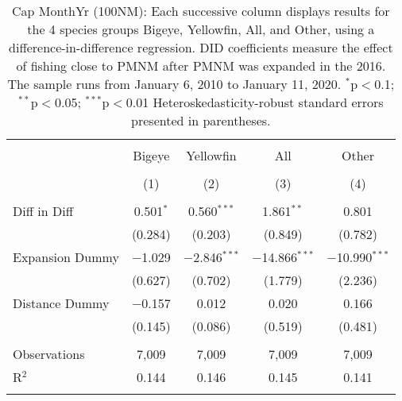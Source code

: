 
\begin{table}[!htbp] \centering 
  \caption{Cap MonthYr (100NM): Each successive column displays results for the 4 species groups Bigeye, Yellowfin, All, and Other, using a difference-in-difference regression. DID coefficients measure the effect of fishing close to PMNM after PMNM was expanded in the 2016. The sample runs from January 6, 2010 to January 11, 2020. $^{*}$p$<$0.1; $^{**}$p$<$0.05; $^{***}$p$<$0.01 Heteroskedasticity-robust standard errors presented in parentheses.} 
  \label{tbl:timeFE100NM} 
\begin{tabular}{@{\extracolsep{5pt}}lcccc} 
\\[-1.8ex]\hline 
\hline \\[-1.8ex] 
 & Bigeye & Yellowfin & All & Other \\ 
\\[-1.8ex] & (1) & (2) & (3) & (4)\\ 
\hline \\[-1.8ex] 
 Diff in Diff & 0.501$^{*}$ & 0.560$^{***}$ & 1.861$^{**}$ & 0.801 \\ 
  & (0.284) & (0.203) & (0.849) & (0.782) \\ 
  Expansion Dummy & $-$1.029 & $-$2.846$^{***}$ & $-$14.866$^{***}$ & $-$10.990$^{***}$ \\ 
  & (0.627) & (0.702) & (1.779) & (2.236) \\ 
  Distance Dummy & $-$0.157 & 0.012 & 0.020 & 0.166 \\ 
  & (0.145) & (0.086) & (0.519) & (0.481) \\ 
 \hline \\[-1.8ex] 
Observations & 7,009 & 7,009 & 7,009 & 7,009 \\ 
R$^{2}$ & 0.144 & 0.146 & 0.145 & 0.141 \\ 
\hline 
\hline \\[-1.8ex] 
\end{tabular} 
\end{table} 

